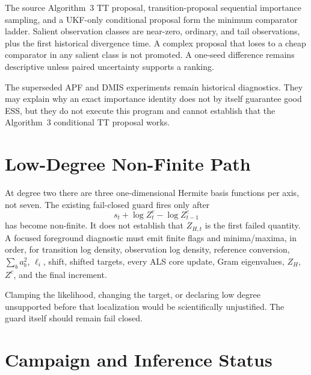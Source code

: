 \documentclass[11pt]{article}
\begin{document}
The source Algorithm~3 TT proposal, transition-proposal sequential importance
sampling, and a UKF-only conditional proposal form the minimum comparator
ladder.  Salient observation classes are near-zero, ordinary, and tail
observations, plus the first historical divergence time.  A complex proposal
that loses to a cheap comparator in any salient class is not promoted.  A
one-seed difference remains descriptive unless paired uncertainty supports a
ranking.

The superseded APF and DMIS experiments remain historical diagnostics.  They
may explain why an exact importance identity does not by itself guarantee good
ESS, but they do not execute this program and cannot establish that the
Algorithm~3 conditional TT proposal works.

\section{Low-Degree Non-Finite Path}

At degree two there are three one-dimensional Hermite basis functions per
axis, not seven. The existing fail-closed guard fires only after
\[
s_t+\log Z^c_t-\log Z^c_{t-1}
\]
has become non-finite. It does not establish that $Z_{H,t}$ is the first failed
quantity. A focused foreground diagnostic must emit finite flags and
minima/maxima, in order, for transition log density, observation log density,
reference conversion, $\sum_ba_b^2$, $\ell_i$, shift, shifted targets, every
ALS core update, Gram eigenvalues, $Z_H$, $Z^c$, and the final increment.

Clamping the likelihood, changing the target, or declaring low degree
unsupported before that localization would be scientifically unjustified.
The guard itself should remain fail closed.

\section{Campaign and Inference Status}
\end{document}
